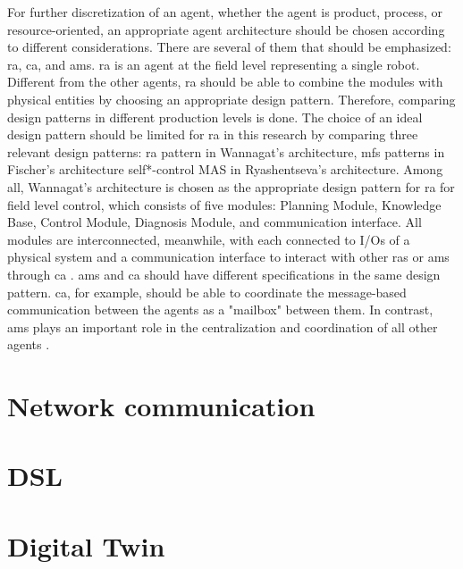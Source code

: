 For further discretization of an agent, whether the agent is product, process, or resource-oriented, an appropriate agent architecture should be chosen according to different considerations. There are several of them that should be emphasized: \gls{ra}, \gls{ca}, and \gls{ams}. \gls{ra} is an agent at the field level representing a single robot. Different from the other agents, \gls{ra} should be able to combine the modules with physical entities by choosing an appropriate design pattern. Therefore, comparing design patterns in different production levels is done\cite{ocker_leveraging_2021}. The choice of an ideal design pattern should be limited for \gls{ra} in this research by comparing three relevant design patterns:  \gls{ra} pattern in Wannagat’s architecture, \gls{mfs} patterns in Fischer’s architecture self*-control MAS in Ryashentseva’s architecture. Among all,  Wannagat’s architecture is chosen as the appropriate design pattern for \gls{ra} for field level control, which consists of five modules: Planning Module, Knowledge Base, Control Module, Diagnosis Module, and communication interface. All modules are interconnected, meanwhile, with each connected to I/Os of a physical system and a communication interface to interact with other \gls{ras} or \gls{ams} through \gls{ca} \cite{cruz_salazar_cyber-physical_2019}. \gls{ams} and \gls{ca} should have different specifications in the same design pattern. \gls{ca}, for example, should be able to coordinate the message-based communication between the agents as a "mailbox" between them. In contrast, \gls{ams} plays an important role in the centralization and coordination of all other agents \cite{wannagat_entwicklung_2010}. 
\section{Network communication}
\section{DSL}
\section{Digital Twin}


